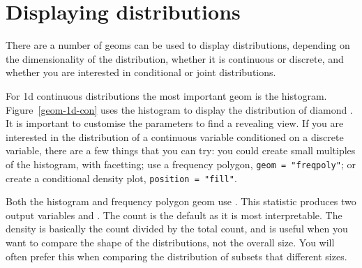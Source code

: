 % 



\section{Displaying distributions}\label{sec:distributions}

There are a number of geoms can be used to display distributions, depending on the dimensionality of the distribution, whether it is continuous or discrete, and whether you are interested in conditional or joint distributions.

For 1d continuous distributions the most important geom is the histogram.  Figure~\ref{geom-1d-con} uses the histogram to display the distribution of diamond .  It is important to customise the parameters to find a revealing view.  If you are interested in the distribution of a continuous variable conditioned on a discrete variable, there are a few things that you can try: you could create small multiples of the histogram,  with facetting; use a frequency polygon, {\tt geom = "freqpoly"}; or create a conditional density plot, {\tt position = "fill"}.  

Both the histogram and frequency polygon geom use .  This statistic produces two output variables  and .  The count is the default as it is most interpretable.  The density is basically the count divided by the total count, and is useful when you want to compare the shape of the distributions, not the overall size.  You will often prefer this when comparing the distribution of subsets that different sizes.

